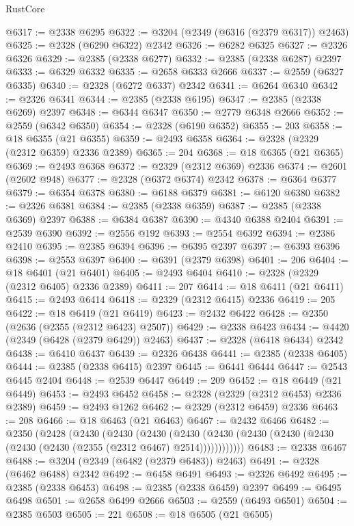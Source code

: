\begin{lexlean}{RustCore}
\begin{coremodule}
@6317 := @2338 @6295
@6322 := @3204 (@2349 (@6316 (@2379 @6317)) @2463)
@6325 := @2328 (@6290 @6322) @2342
@6326 := @6282 @6325
@6327 := @2326 @6326
@6329 := @2385 (@2338 @6277)
@6332 := @2385 (@2338 @6287) @2397
@6333 := @6329 @6332
@6335 := @2658 @6333 @2666
@6337 := @2559 (@6327 @6335)
@6340 := @2328 (@6272 @6337) @2342
@6341 := @6264 @6340
@6342 := @2326 @6341
@6344 := @2385 (@2338 @6195)
@6347 := @2385 (@2338 @6269) @2397
@6348 := @6344 @6347
@6350 := @2779 @6348 @2666
@6352 := @2559 (@6342 @6350)
@6354 := @2328 (@6190 @6352)
@6355 := 203
@6358 := @18 @6355 (@21 @6355)
@6359 := @2493 @6358
@6364 := @2328 (@2329 (@2312 @6359) @2336 @2389)
@6365 := 204
@6368 := @18 @6365 (@21 @6365)
@6369 := @2493 @6368
@6372 := @2329 (@2312 @6369) @2336
@6374 := @2601 (@2602 @948)
@6377 := @2328 (@6372 @6374) @2342
@6378 := @6364 @6377
@6379 := @6354 @6378
@6380 := @6188 @6379
@6381 := @6120 @6380
@6382 := @2326 @6381
@6384 := @2385 (@2338 @6359)
@6387 := @2385 (@2338 @6369) @2397
@6388 := @6384 @6387
@6390 := @4340 @6388 @2404
@6391 := @2539 @6390
@6392 := @2556 @192
@6393 := @2554 @6392
@6394 := @2386 @2410
@6395 := @2385 @6394
@6396 := @6395 @2397
@6397 := @6393 @6396
@6398 := @2553 @6397
@6400 := @6391 (@2379 @6398)
@6401 := 206
@6404 := @18 @6401 (@21 @6401)
@6405 := @2493 @6404
@6410 := @2328 (@2329 (@2312 @6405) @2336 @2389)
@6411 := 207
@6414 := @18 @6411 (@21 @6411)
@6415 := @2493 @6414
@6418 := @2329 (@2312 @6415) @2336
@6419 := 205
@6422 := @18 @6419 (@21 @6419)
@6423 := @2432 @6422
@6428 := @2350 (@2636 (@2355 (@2312 @6423) @2507))
@6429 := @2338 @6423
@6434 := @4420 (@2349 (@6428 (@2379 @6429)) @2463)
@6437 := @2328 (@6418 @6434) @2342
@6438 := @6410 @6437
@6439 := @2326 @6438
@6441 := @2385 (@2338 @6405)
@6444 := @2385 (@2338 @6415) @2397
@6445 := @6441 @6444
@6447 := @2543 @6445 @2404
@6448 := @2539 @6447
@6449 := 209
@6452 := @18 @6449 (@21 @6449)
@6453 := @2493 @6452
@6458 := @2328 (@2329 (@2312 @6453) @2336 @2389)
@6459 := @2493 @1262
@6462 := @2329 (@2312 @6459) @2336
@6463 := 208
@6466 := @18 @6463 (@21 @6463)
@6467 := @2432 @6466
@6482 := @2350
    (@2428
      (@2430
        (@2430
          (@2430
            (@2430 (@2430 (@2430 (@2430 (@2430 (@2430 (@2430 (@2355 (@2312 @6467) @2514))))))))))))
@6483 := @2338 @6467
@6488 := @3204 (@2349 (@6482 (@2379 @6483)) @2463)
@6491 := @2328 (@6462 @6488) @2342
@6492 := @6458 @6491
@6493 := @2326 @6492
@6495 := @2385 (@2338 @6453)
@6498 := @2385 (@2338 @6459) @2397
@6499 := @6495 @6498
@6501 := @2658 @6499 @2666
@6503 := @2559 (@6493 @6501)
@6504 := @2385 @6503
@6505 := 221
@6508 := @18 @6505 (@21 @6505)

\end{coremodule}
\end{lexlean}
